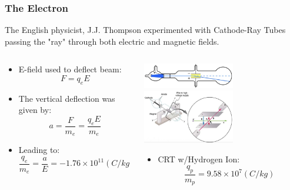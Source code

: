 \documentclass{beamer}
\begin{document}
\begin{frame}\frametitle{The Electron}
The English physicist, J.J. Thompson experimented with Cathode-Ray Tubes passing the "ray" through both electric and magnetic fields.
\begin{columns}
\begin{column}{7cm}


\begin{itemize}
\item E-field used to deflect beam:
\[ F = q_e E \]
\item The vertical deflection was given by:
\[ a = \frac{F}{m_e} = \frac{q_e E}{m_e} \]

\item Leading to:
\[ \frac{q_e}{m_e} = \frac{a}{E} = -1.76 \times 10^{11} (C/kg) \]
\end{itemize}
\end{column}
\begin{column}{4.5cm}
\begin{center}
\includegraphics[width=4cm]{fig/crt1.jpg}
\includegraphics[width=4cm]{fig/crt2.jpg}
\end{center}
\begin{itemize}
\item CRT w/Hydrogen Ion:
\[ \frac{q_p}{m_p} = 9.58 \times 10^7 (C/kg) \]
\end{itemize}

\end{column}
\end{columns}
\end{frame}
\end{document}
